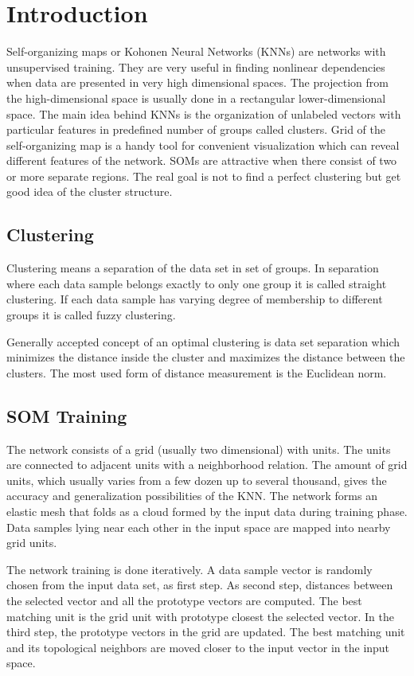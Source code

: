 \documentclass[runningheads]{llncs}
\begin{document}
\section{Introduction}

Self-organizing maps or Kohonen Neural Networks (KNNs) are networks with unsupervised training. They are very useful in finding nonlinear dependencies when data are presented in very high dimensional spaces. The projection from the high-dimensional space is usually done in a rectangular lower-dimensional space. The main idea behind KNNs is the organization of unlabeled vectors with particular features in predefined number of groups called clusters. Grid of the self-organizing map is a handy tool for convenient visualization which can reveal different features of the network. SOMs are attractive when there consist of two or more separate regions. The real goal is not to find a perfect clustering but get good idea of the cluster structure. 

\subsection{Clustering}

Clustering means a separation of the data set in set of groups. In separation where each data sample belongs exactly to only one group it is called straight clustering. If each data sample has varying degree of membership to different groups it is called fuzzy clustering.

Generally accepted concept of an optimal clustering is data set separation which minimizes the distance inside the cluster and maximizes the distance between the clusters. The most used form of distance measurement is the Euclidean norm. 

\subsection{SOM Training}

The network consists of a grid (usually two dimensional) with units. The units are connected to adjacent units with a neighborhood relation. The amount of grid units, which usually varies from a few dozen up to several thousand, gives the accuracy and generalization possibilities of the KNN. The network forms an elastic mesh that folds
as a cloud formed by the input data during training phase. Data samples lying near each other in the input space are mapped into nearby grid units. 

The network training is done iteratively. A data sample vector is randomly chosen from the input data set, as first step. As second step, distances between the selected vector and all the prototype vectors are computed. The best matching unit is the grid unit with prototype closest the selected vector. In the third step, the prototype vectors in the grid are updated. The best matching unit and its topological neighbors are moved closer to the input vector in the input space. 
\end{document}
